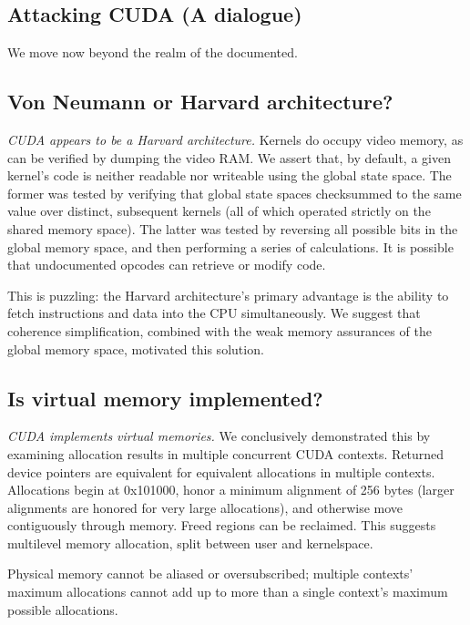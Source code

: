 \documentclass[letterpaper,10pt]{article}
\begin{document}
\begin{multicols}{2}
\section{Attacking CUDA (A dialogue)}
We move now beyond the realm of the documented.
\subsection{Von Neumann or Harvard architecture?}
\textit{CUDA appears to be a Harvard architecture.} Kernels do occupy
video memory, as can be verified by dumping the video RAM. We assert that, by
default, a given kernel's code is neither readable nor writeable using
the global state space. The former was tested by verifying that global state
spaces checksummed to the same value over distinct, subsequent kernels (all of
which operated strictly on the shared memory space). The latter was tested by
reversing all possible bits in the global memory space, and then performing a
series of calculations. It is possible that undocumented opcodes can retrieve
or modify code.

This is puzzling: the Harvard architecture's primary advantage is the ability
to fetch instructions and data into the CPU simultaneously. We suggest that
coherence simplification, combined with the weak memory assurances of the global
memory space, motivated this solution.
\subsection{Is virtual memory implemented?}
\textit{CUDA implements virtual memories.} We conclusively demonstrated this
by examining allocation results in multiple concurrent CUDA contexts. Returned
device pointers are equivalent for equivalent allocations in multiple contexts.
Allocations begin at 0x101000, honor a minimum alignment of 256 bytes (larger
alignments are honored for very large allocations), and otherwise move
contiguously through memory. Freed regions can be reclaimed. This suggests
multilevel memory allocation, split between user and kernelspace.

Physical memory cannot be aliased or oversubscribed; multiple contexts'
maximum allocations cannot add up to more than a single context's maximum
possible allocations.

\end{multicols}
\end{document}
